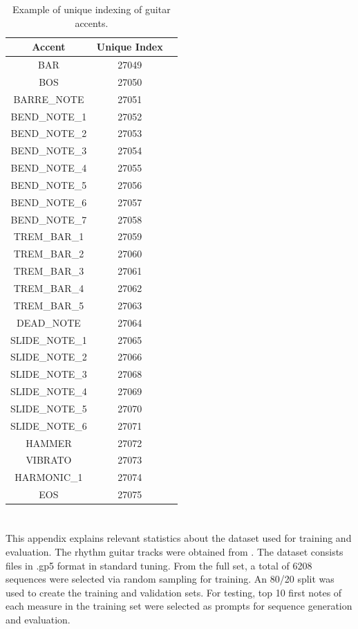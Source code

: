 \documentclass[twoside,11pt]{article}
\begin{document}
\noindent
\begin{table}[h!]
\centering
\begin{tabular}{|c|c|c|}
\hline
\textbf{Accent} & \textbf{Unique Index} \\
\hline
BAR  & 27049\\
BOS  & 27050\\
BARRE\_NOTE & 27051\\
BEND\_NOTE\_1 & 27052\\
BEND\_NOTE\_2 & 27053\\
BEND\_NOTE\_3 & 27054\\
BEND\_NOTE\_4 & 27055\\
BEND\_NOTE\_5 & 27056\\
BEND\_NOTE\_6 & 27057\\
BEND\_NOTE\_7 & 27058\\
TREM\_BAR\_1 & 27059\\
TREM\_BAR\_2 & 27060\\
TREM\_BAR\_3 & 27061\\
TREM\_BAR\_4 & 27062\\
TREM\_BAR\_5 & 27063\\
DEAD\_NOTE & 27064\\
SLIDE\_NOTE\_1 & 27065\\
SLIDE\_NOTE\_2 & 27066\\
SLIDE\_NOTE\_3 & 27068\\
SLIDE\_NOTE\_4 & 27069\\
SLIDE\_NOTE\_5 & 27070\\
SLIDE\_NOTE\_6 & 27071\\
HAMMER & 27072\\
VIBRATO & 27073\\
HARMONIC\_1 & 27074\\
EOS  & 27075\\
\hline
\end{tabular}
\caption{Example of unique indexing of guitar accents.}
\label{tab:accent_indexing}
\end{table}

\section{}
\label{app:B}
This appendix explains relevant statistics about the dataset used for training and evaluation.
The rhythm guitar tracks were obtained from \cite{SCORESET}.
The dataset consists files in .gp5 format in standard tuning. 
From the full set, a total of 6208 sequences were selected via random sampling for training.
An 80/20 split was used to create the training and validation sets. 
For testing, top 10 first notes of each measure in the training set were selected as 
prompts for sequence generation and evaluation.
\end{document}

